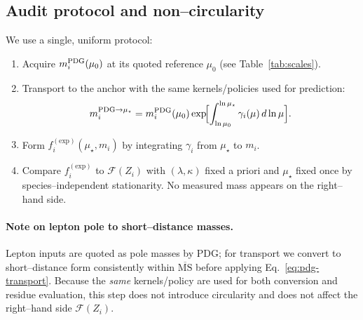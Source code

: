 \documentclass[aps,prd,onecolumn,amsmath,amssymb,superscriptaddress,nofootinbib,showpacs,showkeys]{revtex4-2}
\begin{document}
\subsection{Audit protocol and non--circularity}
We use a single, uniform protocol:
\begin{enumerate} %
  \item Acquire $m_i^{\rm PDG}(\mu_0)$ at its quoted reference $\mu_0$ (see Table~\ref{tab:scales}).
  \item Transport to the anchor with the same kernels/policies used for prediction:
  \[
  m_i^{\rm PDG\to\mu_\star}=m_i^{\rm PDG}(\mu_0)\exp\!\Bigl[\int_{\ln\mu_0}^{\ln\mu_\star}\gamma_i(\mu)\,d\ln\mu\Bigr].
  \]
  \item Form $f_i^{\mathrm{(exp)}}(\mu_\star,m_i)$ by integrating $\gamma_i$ from $\mu_\star$ to $m_i$.
  \item Compare $f_i^{\mathrm{(exp)}}$ to $\mathcal{F}(Z_i)$ with $(\lambda,\kappa)$ fixed a priori and $\mu_\star$ fixed once by species–independent stationarity. No measured mass appears on the right–hand side.
\end{enumerate}

\paragraph{Note on lepton pole to short--distance masses.}
Lepton inputs are quoted as pole masses by PDG; for transport we convert to short–distance form consistently within $\overline{\mathrm{MS}}$ before applying Eq.~\ref{eq:pdg-transport}. Because the \emph{same} kernels/policy are used for both conversion and residue evaluation, this step does not introduce circularity and does not affect the right–hand side $\mathcal F(Z_i)$.

\end{document}

